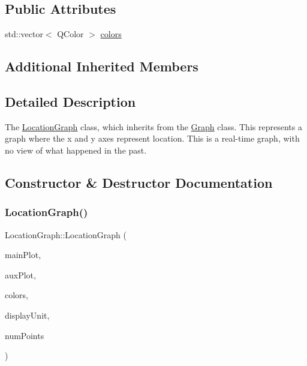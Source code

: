 \subsection*{Public Attributes}
\begin{DoxyCompactItemize}
\item 
std\+::vector$<$ Q\+Color $>$ \hyperlink{class_location_graph_af5c037a973c98ff0a17853f8ef661c7f}{colors}
\end{DoxyCompactItemize}
\subsection*{Additional Inherited Members}


\subsection{Detailed Description}
The \hyperlink{class_location_graph}{Location\+Graph} class, which inherits from the \hyperlink{class_graph}{Graph} class. This represents a graph where the x and y axes represent location. This is a real-\/time graph, with no view of what happened in the past. 

\subsection{Constructor \& Destructor Documentation}
\hypertarget{class_location_graph_aabdd9cf30c4ff8bc2e522aab71f4f094}{}\label{class_location_graph_aabdd9cf30c4ff8bc2e522aab71f4f094} 
\subsubsection{\texorpdfstring{Location\+Graph()}{LocationGraph()}}
{\footnotesize\ttfamily Location\+Graph\+::\+Location\+Graph (\begin{DoxyParamCaption}\item[{Q\+Custom\+Plot $\ast$}]{main\+Plot,  }\item[{Q\+Custom\+Plot $\ast$}]{aux\+Plot,  }\item[{std\+::vector$<$ Q\+Color $>$}]{colors,  }\item[{Q\+String}]{display\+Unit,  }\item[{int}]{num\+Points }\end{DoxyParamCaption})}



